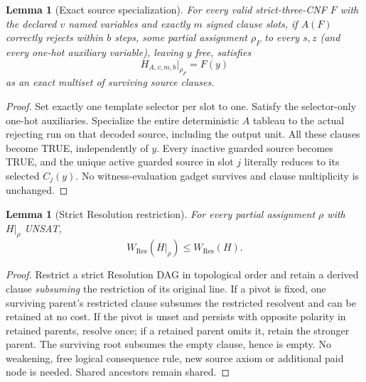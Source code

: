 \documentclass[11pt]{article}
\newtheorem{lemma}[theorem]{Lemma}
\begin{document}
\begin{lemma}[Exact source specialization]\label{special}
For every valid strict-three-CNF \(F\) with the declared \(v\) named variables and exactly \(m\) signed clause slots, if \(A(F)\) correctly rejects within \(b\) steps, some partial assignment \(\rho_F\) to every \(s,z\) (and every one-hot auxiliary variable), leaving \(y\) free, satisfies
\[
\boxed{H_{A,v,m,b}|_{\rho_F}=F(y)}
\tag{2}
\]
as an exact multiset of surviving source clauses.
\end{lemma}
\begin{proof}
Set exactly one template selector per slot to one. Satisfy the selector-only one-hot auxiliaries. Specialize the entire deterministic \(A\) tableau to the actual rejecting run on that decoded source, including the output unit. All these clauses become TRUE, independently of \(y\). Every inactive guarded source becomes TRUE, and the unique active guarded source in slot \(j\) literally reduces to its selected \(C_j(y)\). No witness-evaluation gadget survives and clause multiplicity is unchanged.
\end{proof}

\begin{lemma}[Strict Resolution restriction]\label{restriction}
For every partial assignment \(\rho\) with \(H|_\rho\) UNSAT,
\[
W_{\mathrm{Res}}(H|_\rho)\le W_{\mathrm{Res}}(H). \tag{3}
\]
\end{lemma}
\begin{proof}
Restrict a strict Resolution DAG in topological order and retain a derived clause \emph{subsuming} the restriction of its original line. If a pivot is fixed, one surviving parent's restricted clause subsumes the restricted resolvent and can be retained at no cost. If the pivot is unset and persists with opposite polarity in retained parents, resolve once; if a retained parent omits it, retain the stronger parent. The surviving root subsumes the empty clause, hence is empty. No weakening, free logical consequence rule, new source axiom or additional paid node is needed. Shared ancestors remain shared.
\end{proof}
\end{document}
